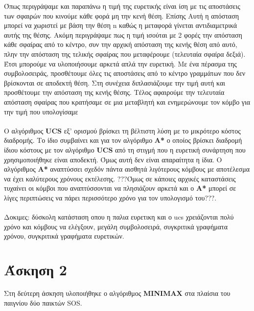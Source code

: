 \documentclass{article}
\begin{document}
        Όπως περιγράψαμε και παραπάνω η τιμή της ευρετικής είναι ίση με τις αποστάσεις των σφαιρών που κινούμε κάθε φορά μη την κενή θέση. Επίσης Αυτή η απόσταση μπορεί να χωριστεί με βάση την θέση n καθώς η μεταφορά γίνεται αντιδιαμετρικά αυτής της θέσης. Ακόμη περιγράψαμε πως η τιμή ισούται με 2 φορές την απόσταση κάθε σφαίρας από το κέντρο, συν την αρχική απόσταση της κενής θέση από αυτό, πλην την απόσταση της τελικής σφαίρας που μεταφέρουμε (τελευταία σφαίρα δεξιά). Έτσι μπορούμε να υλοποιήσουμε αρκετά απλά την ευρετική. Με ένα πέρασμα της συμβολοσειράς, προσθέτουμε όλες τις αποστάσεις από το κέντρο γραμμάτων που δεν βρίσκονται σε αποδεκτή θέση. Στη συνέχεια διπλασιάζουμε την τιμή αυτή και προσθέτουμε την απόσταση της κενής θέσης. Τέλος αφαιρούμε την τελευταία απόσταση σφαίρας που κρατήσαμε σε μια μεταβλητή και ενημερώνουμε τον κόμβο για την τιμή που υπολογίσαμε\\\\
        Ο αλγόριθμος \textbf{UCS} εξ' ορισμού βρίσκει τη βέλτιστη λύση με το μικρότερο κόστος διαδρομής. Το ίδιο συμβαίνει και για τον αλγόριθμο \textbf{Α*} ο οποίος βρίσκει διαδρομή ίδιου κόστους με τον αλγόριθμο \textbf{UCS} από τη στιγμή που η ευρετική συνάρτηση που χρησιμοποιήθηκε είναι αποδεκτή. Όμως αυτή δεν είναι απαραίτητα η ίδια. Ο αλγόριθμος \textbf{A*} αναπτύσσει σχεδόν πάντα αισθητά λιγότερους κόμβους με αποτέλεσμα να έχει καλύτερους χρόνους εκτέλεσης. ???Όμως σε κάποιες αρχικές καταστάσεις τυχαίνει οι κόμβοι που αναπτύσσονται να πλησιάζουν αρκετά και ο \textbf{A*} μπορεί σε λίγες περιπτώσεις να πάρει περισσότερο χρόνο για τον υπολογισμό του???.\\\\
        
        Δοκιμες: δύσκολη κατάσταση οπου η παλια ευρετικη και ο ucs χρειάζονται πολύ χρόνο και κόμβους να ελέγξουν, μεγάλη συμβολοσειρά, συγκριτικά γραφήματα χρόνου, συγκριτικά γραφήματα ευρετικών.
    
    \newpage
    
    \section*{Άσκηση 2}
        Στη δεύτερη άσκηση υλοποιήθηκε ο αλγόριθμος \textbf{MINIMAX} στα πλαίσια του παιγνίου δύο παικτών SOS.
\end{document}
